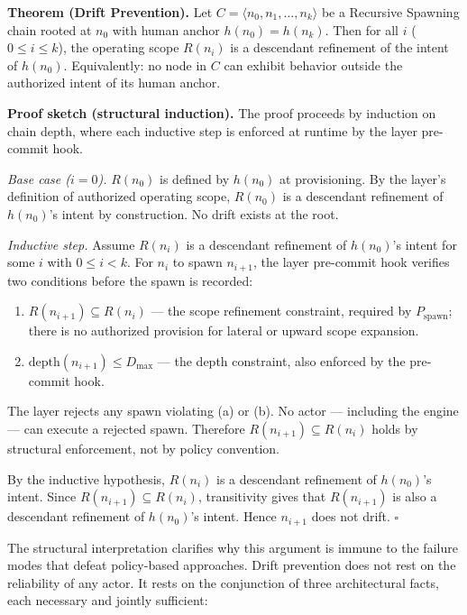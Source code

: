 \medskip
\noindent\textbf{Theorem (Drift Prevention).} Let $C = \langle n_0, n_1, \ldots, n_k \rangle$ be a Recursive Spawning chain rooted at $n_0$ with human anchor $h(n_0) = h(n_k)$. Then for all $i$ ($0 \leq i \leq k$), the operating scope $R(n_i)$ is a descendant refinement of the intent of $h(n_0)$. Equivalently: no node in $C$ can exhibit behavior outside the authorized intent of its human anchor.

\medskip
\noindent\textbf{Proof sketch (structural induction).} The proof proceeds by induction on chain depth, where each inductive step is enforced at runtime by the \fact{} layer pre-commit hook.

\medskip
\textit{Base case ($i=0$).} $R(n_0)$ is defined by $h(n_0)$ at provisioning. By the \purpose{} layer's definition of authorized operating scope, $R(n_0)$ is a descendant refinement of $h(n_0)$'s intent by construction. No drift exists at the root.

\medskip
\textit{Inductive step.} Assume $R(n_i)$ is a descendant refinement of $h(n_0)$'s intent for some $i$ with $0 \leq i < k$. For $n_i$ to spawn $n_{i+1}$, the \fact{} layer pre-commit hook verifies two conditions before the spawn is recorded:

\begin{enumerate}
    \item[(a)] $R(n_{i+1}) \subseteq R(n_i)$ --- the scope refinement constraint, required by $P_{\mathrm{spawn}}$; there is no authorized provision for lateral or upward scope expansion.
    \item[(b)] $\mathrm{depth}(n_{i+1}) \leq D_{\mathrm{max}}$ --- the depth constraint, also enforced by the pre-commit hook.
\end{enumerate}

The \fact{} layer rejects any spawn violating (a) or (b). No actor --- including the \bounds{} engine --- can execute a rejected spawn. Therefore $R(n_{i+1}) \subseteq R(n_i)$ holds by structural enforcement, not by policy convention.

By the inductive hypothesis, $R(n_i)$ is a descendant refinement of $h(n_0)$'s intent. Since $R(n_{i+1}) \subseteq R(n_i)$, transitivity gives that $R(n_{i+1})$ is also a descendant refinement of $h(n_0)$'s intent. Hence $n_{i+1}$ does not drift. $\square$

\medskip
The structural interpretation clarifies why this argument is immune to the failure modes that defeat policy-based approaches. Drift prevention does not rest on the reliability of any actor. It rests on the conjunction of three architectural facts, each necessary and jointly sufficient:

